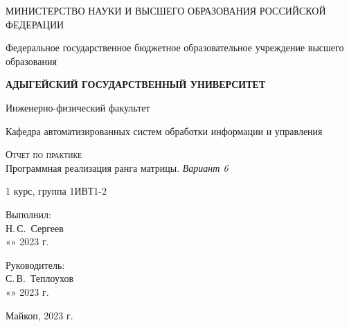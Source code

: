\documentclass[12pt,a4paper]{scrartcl}
\begin{document}
 \begin{titlepage}
  \begin{center}
   \large
   МИНИСТЕРСТВО НАУКИ И ВЫСШЕГО ОБРАЗОВАНИЯ РОССИЙСКОЙ ФЕДЕРАЦИИ
   
   Федеральное государственное бюджетное образовательное учреждение высшего образования
   
   \textbf{АДЫГЕЙСКИЙ ГОСУДАРСТВЕННЫЙ УНИВЕРСИТЕТ}
   \vspace{0.25cm}
   
   Инженерно-физический факультет
   
   Кафедра автоматизированных систем обработки информации и управления
   \vfill

   \vfill
   
   \textsc{Отчет по практике}\\[5mm]
   
   {\LARGE Программная реализация ранга матрицы. \textit{Вариант 6}}
   \bigskip
   
   1 курс, группа 1ИВТ1-2
  \end{center}
  \vfill
  
  \newlength{\ML}
  \hfill\begin{minipage}{0.5\textwidth}
   Выполнил:\\
   \underline{\hspace{\ML}} Н.\,С.~Сергеев\\
   «\underline{\hspace{0.7cm}}» \underline{\hspace{2cm}} 2023 г.
  \end{minipage}%
  \bigskip
  
  \hfill\begin{minipage}{0.5\textwidth}
   Руководитель:\\
   \underline{\hspace{\ML}} С.\,В.~Теплоухов\\
   «\underline{\hspace{0.7cm}}» \underline{\hspace{2cm}} 2023 г.
  \end{minipage}%
  \vfill
  
  \begin{center}
   Майкоп, 2023 г.
  \end{center}
 \end{titlepage}
 
\end{document}
